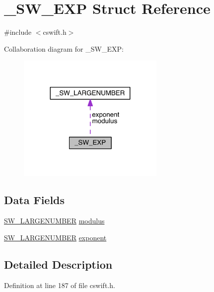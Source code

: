 \hypertarget{struct___s_w___e_x_p}{}\section{\+\_\+\+S\+W\+\_\+\+E\+XP Struct Reference}
\label{struct___s_w___e_x_p}


{\ttfamily \#include $<$cswift.\+h$>$}



Collaboration diagram for \+\_\+\+S\+W\+\_\+\+E\+XP\+:\nopagebreak
\begin{figure}[H]
\begin{center}
\leavevmode
\includegraphics[width=200pt]{struct___s_w___e_x_p__coll__graph}
\end{center}
\end{figure}
\subsection*{Data Fields}
\begin{DoxyCompactItemize}
\item 
\hyperlink{cswift_8h_aace52592ab28d0cb89b2ede5e864d859}{S\+W\+\_\+\+L\+A\+R\+G\+E\+N\+U\+M\+B\+ER} \hyperlink{struct___s_w___e_x_p_a9f75d3cee7e8a48a96f993a4d18b605e}{modulus}
\item 
\hyperlink{cswift_8h_aace52592ab28d0cb89b2ede5e864d859}{S\+W\+\_\+\+L\+A\+R\+G\+E\+N\+U\+M\+B\+ER} \hyperlink{struct___s_w___e_x_p_a791a36a530c111271191c771d69295dc}{exponent}
\end{DoxyCompactItemize}


\subsection{Detailed Description}


Definition at line 187 of file cswift.\+h.



